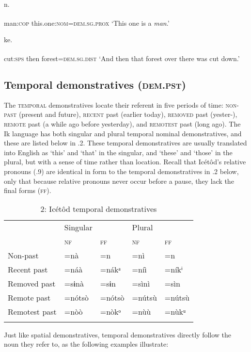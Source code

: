 \ea\label{ex:}
 n. \\
    \\
man:\textsc{cop}  this.one:\textsc{nom}=\textsc{dem.sg.prox}
\glt ‘This one is a \textit{man}.’ 
\z




\ea\label{ex:}
 ke. \\
    \\
cut:\textsc{sps}   then   forest=\textsc{dem.sg.dist}
\glt ‘And then that forest over there was cut down.’ 
\z






\subsection{Temporal demonstratives (\textsc{dem.pst})}


The \textsc{temporal} demonstratives locate their referent in five periods of time: \textsc{non-past} (present and future), \textsc{recent} past (earlier today), \textsc{removed} past (yester-), \textsc{remote} past (a while ago before yesterday), and \textsc{remotest} past (long ago). The Ik language has both singular and plural temporal nominal demonstratives, and these are listed below in .2. These temporal demonstratives are usually translated into English as ‘this’ and ‘that’ in the singular, and ‘these’ and ‘those’ in the plural, but with a sense of time rather than location. Recall that Icétôd’s relative pronouns (.9) are identical in form to the temporal demonstratives in .2 below, only that because relative pronouns never occur before a pause, they lack the final forms (\textsc{ff}).


\begin{table}
\caption{2: Icétôd temporal demonstratives}
\label{tab:6}


\begin{tabularx}{\textwidth}{XXXXX} & Singular &  & Plural & \\
\lsptoprule
& \textsc{nf} & \textsc{ff} & \textsc{nf} & \textsc{ff}\\
Non-past & =nà & =n & =nì & =n\\
Recent past & =náà & =nákᵃ & =níì & =níkⁱ\\
Removed past & =sɨnà & =sɨn & =sìnì & =sìn\\
Remote past & =nótsò & =nótsò & =nútsù & =nútsù\\
Remotest past & =nòò & =nòkᵒ & =nùù & =nùkᵘ\\
\lspbottomrule
\end{tabularx}
\end{table}
Just like spatial demonstratives, temporal demonstratives directly follow the noun they refer to, as the following examples illustrate:




